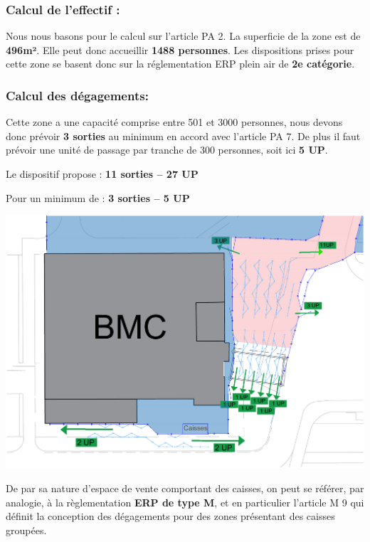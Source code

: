 \documentclass[hidelinks, paper=a4, fontsize=13pt]{report}
\begin{document}
\subsubsection{Calcul de l’effectif :}
Nous nous basons pour le calcul sur l’article PA 2. La superficie de la zone est de \textbf{496m²}. Elle peut donc accueillir \textbf{1488 personnes}. Les dispositions prises pour cette zone se basent donc sur la réglementation ERP plein air de \textbf{2e catégorie}. \\
\subsubsection{Calcul des dégagements:}
Cette zone a une capacité comprise entre 501 et 3000 personnes, nous devons donc prévoir \textbf{3 sorties} au minimum en accord avec l’article PA 7. De plus il faut prévoir une unité de passage par tranche de 300 personnes, soit ici \textbf{5 UP}. 
\begin{center}
	Le dispositif propose :        \textbf{11 sorties – 27 UP}
	
	Pour un minimum de :         \textbf{ 3 sorties – 5 UP}
\end{center}

\begin{center}
	\includegraphics[width=.8\textwidth,keepaspectratio]{Exports/Plan_24h_45eme-Entree_IS}
\end{center}

De par sa nature d’espace de vente comportant des caisses, on peut se référer, par analogie, à la règlementation \textbf{ERP de type M}, et en particulier l’article M 9 qui définit la conception des dégagements pour des zones présentant des caisses groupées. \\
\end{document}
